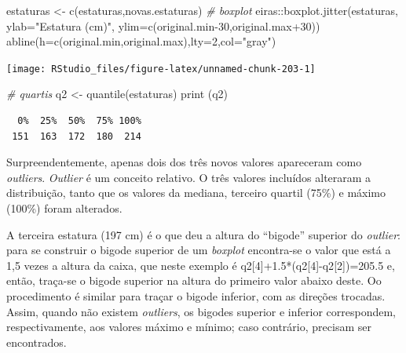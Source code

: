 \documentclass[
]{article}
\newenvironment{Shaded}{\begin{snugshade}}{\end{snugshade}}
\newcommand{\AttributeTok}[1]{\textcolor[rgb]{0.77,0.63,0.00}{#1}}
\newcommand{\CommentTok}[1]{\textcolor[rgb]{0.56,0.35,0.01}{\textit{#1}}}
\newcommand{\DecValTok}[1]{\textcolor[rgb]{0.00,0.00,0.81}{#1}}
\newcommand{\FunctionTok}[1]{\textcolor[rgb]{0.00,0.00,0.00}{#1}}
\newcommand{\NormalTok}[1]{#1}
\newcommand{\OtherTok}[1]{\textcolor[rgb]{0.56,0.35,0.01}{#1}}
\newcommand{\SpecialCharTok}[1]{\textcolor[rgb]{0.00,0.00,0.00}{#1}}
\newcommand{\StringTok}[1]{\textcolor[rgb]{0.31,0.60,0.02}{#1}}
\begin{document}
\begin{Shaded}
\begin{Highlighting}[]
\NormalTok{estaturas }\OtherTok{\textless{}{-}} \FunctionTok{c}\NormalTok{(estaturas,novas.estaturas)}
\CommentTok{\# boxplot}
\NormalTok{eiras}\SpecialCharTok{::}\FunctionTok{boxplot.jitter}\NormalTok{(estaturas, }\AttributeTok{ylab=}\StringTok{"Estatura (cm)"}\NormalTok{, }
               \AttributeTok{ylim=}\FunctionTok{c}\NormalTok{(original.min}\DecValTok{{-}30}\NormalTok{,original.max}\SpecialCharTok{+}\DecValTok{30}\NormalTok{))}
\FunctionTok{abline}\NormalTok{(}\AttributeTok{h=}\FunctionTok{c}\NormalTok{(original.min,original.max),}\AttributeTok{lty=}\DecValTok{2}\NormalTok{,}\AttributeTok{col=}\StringTok{"gray"}\NormalTok{)}
\end{Highlighting}
\end{Shaded}

\begin{center}\texttt{[image: RStudio\_files/figure-latex/unnamed-chunk-203-1]} \end{center}

\begin{Shaded}
\begin{Highlighting}[]
\CommentTok{\# quartis}
\NormalTok{q2 }\OtherTok{\textless{}{-}} \FunctionTok{quantile}\NormalTok{(estaturas)}
\FunctionTok{print}\NormalTok{ (q2)}
\end{Highlighting}
\end{Shaded}

\begin{verbatim}
  0%  25%  50%  75% 100% 
 151  163  172  180  214 
\end{verbatim}

Surpreendentemente, apenas dois dos três novos valores apareceram como
\emph{outliers}. \emph{Outlier} é um conceito relativo. O três valores
incluídos alteraram a distribuição, tanto que os valores da mediana,
terceiro quartil (75\%) e máximo (100\%) foram alterados.

A terceira estatura (197 cm) é o que deu a altura do ``bigode'' superior
do \emph{outlier}: para se construir o bigode superior de um
\emph{boxplot} encontra-se o valor que está a 1,5 vezes a altura da
caixa, que neste exemplo é q2{[}4{]}+1.5*(q2{[}4{]}-q2{[}2{]})=205.5 e,
então, traça-se o bigode superior na altura do primeiro valor abaixo
deste. Oo procedimento é similar para traçar o bigode inferior, com as
direções trocadas. Assim, quando não existem \emph{outliers}, os bigodes
superior e inferior correspondem, respectivamente, aos valores máximo e
mínimo; caso contrário, precisam ser encontrados.
\end{document}
